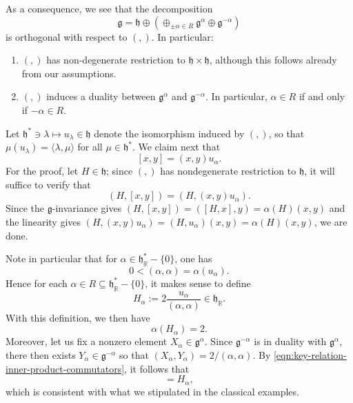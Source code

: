\documentclass[reqno]{amsart} 
\begin{document}
As a consequence, we see that the decomposition
\begin{equation}
  \mathfrak{g} = \mathfrak{h} \oplus (\oplus_{\pm \alpha \in R}
  \mathfrak{g}^{\alpha} \oplus \mathfrak{g}^{-\alpha})
\end{equation}
is orthogonal with respect to $(,)$.  In particular:
\begin{enumerate}
\item $(,)$ has non-degenerate restriction to $\mathfrak{h} \times \mathfrak{h}$, although this follows already from our assumptions.
\item $(,)$ induces a duality between $\mathfrak{g}^\alpha$ and $\mathfrak{g}^{-\alpha}$.  In particular, $\alpha \in R$ if and only if $- \alpha \in R$.
\end{enumerate}

Let $\mathfrak{h}^* \ni \lambda \mapsto u_\lambda \in \mathfrak{h}$ denote the isomorphism induced by $(,)$, so that $\mu(u_\lambda) = \langle \lambda,\mu \rangle$ for all $\mu \in \mathfrak{h}^*$.  We claim next that
\begin{equation}\label{eqn:key-relation-inner-product-commutators}
 [x,y] = (x,y) u_\alpha.
\end{equation}
For the proof, let $H \in \mathfrak{h}$; since $(,)$ has nondegenerate restriction to $\mathfrak{h}$, it will suffice to verify that
\begin{equation*}
  (H,[x,y]) = (H,(x,y) u_\alpha).
\end{equation*}
Since the $\mathfrak{g}$-invariance gives $(H,[x,y]) = ([H,x],y) = \alpha(H) (x,y)$ and the linearity gives $(H,(x,y) u_\alpha) = (H,u_\alpha) (x,y) = \alpha(H) (x,y)$, we are done.

Note in particular that for $\alpha \in \mathfrak{h}_\mathbb{R}^* - \{0\}$, one has
\begin{equation*}
  0 < (\alpha,\alpha) = \alpha(u_\alpha).
\end{equation*}
Hence for each $\alpha \in R \subseteq \mathfrak{h}_\mathbb{R}^* - \{0\}$, it makes sense to define
\begin{equation*}
  H_\alpha := 2 \frac{u_\alpha}{(\alpha,\alpha)} \in \mathfrak{h}_\mathbb{R}.
\end{equation*}
With this definition, we then have
\begin{equation*}
  \alpha(H_\alpha) = 2.
\end{equation*}
Moreover, let us fix a nonzero element $X_\alpha \in \mathfrak{g}^\alpha$.  Since $\mathfrak{g}^{-\alpha}$ is in duality with $\mathfrak{g}^\alpha$, there then exists $Y_\alpha \in \mathfrak{g}^{-\alpha}$ so that $(X_\alpha,Y_\alpha) = 2 / (\alpha,\alpha)$.  By \eqref{eqn:key-relation-inner-product-commutators}, it follows that
\begin{equation*}
 [X_\alpha,Y_\alpha] = H_\alpha,
\end{equation*}
which is consistent with what we stipulated in the classical examples.
\end{document}
